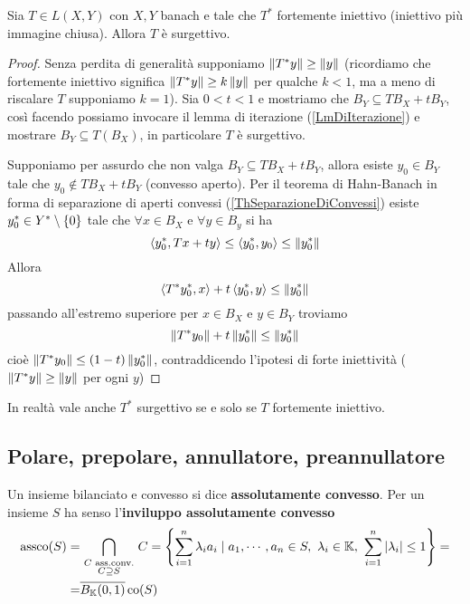 \begin{theorem}\label{ThSurgettivitaEAggiunti}
Sia $T\in L(X,Y)$ con $X,Y$ banach e tale che $T^\ast$ fortemente iniettivo (iniettivo pi\`u immagine chiusa). Allora $T$ \`e surgettivo.
\end{theorem}
\begin{proof}
Senza perdita di generalit\`a supponiamo $\left\Vert{T^\ast y}\right\Vert\geq \left\Vert{y}\right\Vert$ (ricordiamo che fortemente iniettivo significa $\left\Vert{T^\ast y}\right\Vert\geq k\left\Vert{y}\right\Vert$ per qualche $k<1$, ma a meno di riscalare $T$ supponiamo $k=1$). Sia $0<t<1$ e mostriamo che $B_Y\subseteq TB_X+tB_Y$, cos\`i facendo possiamo invocare il lemma di iterazione (\ref{LmDiIterazione}) e mostrare $B_Y\subseteq T(B_X)$, in particolare $T$ \`e surgettivo.

Supponiamo per assurdo che non valga $B_Y\subseteq TB_X+tB_Y$, allora esiste $y_0\in B_Y$ tale che $y_0\notin TB_X+tB_Y$ (convesso aperto). Per il teorema di Hahn-Banach in forma di separazione di aperti convessi (\ref{ThSeparazioneDiConvessi}) esiste $y^\ast_0\in Y^\ast\setminus\{0\}$ tale che $\forall x\in B_X$ e $\forall y\in B_y$ si ha
\[\left\langle {y^\ast_0,Tx+ty}\right\rangle\leq \left\langle {y^\ast_0,y_0}\right\rangle\leq \left\Vert{y^\ast_0}\right\Vert\]
Allora
\[\left\langle {T^\ast y_0^\ast,x}\right\rangle+t\left\langle {y_0^\ast,y}\right\rangle\leq \left\Vert{y_0^\ast}\right\Vert\]
passando all'estremo superiore per $x\in B_X$ e $y\in B_Y$ troviamo
\[\left\Vert{T^\ast y_0}\right\Vert+t\left\Vert{y^\ast_0}\right\Vert\leq\left\Vert{y_0^\ast}\right\Vert\]
cio\`e $\left\Vert{T^\ast y_0}\right\Vert\leq (1-t)\left\Vert{y^\ast_0}\right\Vert$, contraddicendo l'ipotesi di forte iniettivit\`a ($\left\Vert{T^\ast y}\right\Vert\geq \left\Vert{y}\right\Vert$ per ogni $y$)
\end{proof}

\begin{remark}
In realt\`a vale anche $T^\ast$ surgettivo se e solo se $T$ fortemente iniettivo.
\end{remark}


\subsection{Polare, prepolare, annullatore, preannullatore}
\begin{definition}
Un insieme bilanciato e convesso si dice \textbf{assolutamente convesso}. Per un insieme $S$ ha senso l'\textbf{inviluppo assolutamente convesso}
\begin{align*}
    \assco(S)=&\bigcap_{\smat{C\text{ ass.conv.}\\ C\supseteq S}}C=\cpa{\sum_{i=1}^n\la_i a_i\mid a_1,\cdots, a_n\in S,\ \la_i\in \K,\ \sum_{i=1}^n\abs{\la_i}\leq1}=\\
    =&\ol{B_\K(0,1)}\co(S)
\end{align*}
\end{definition}

